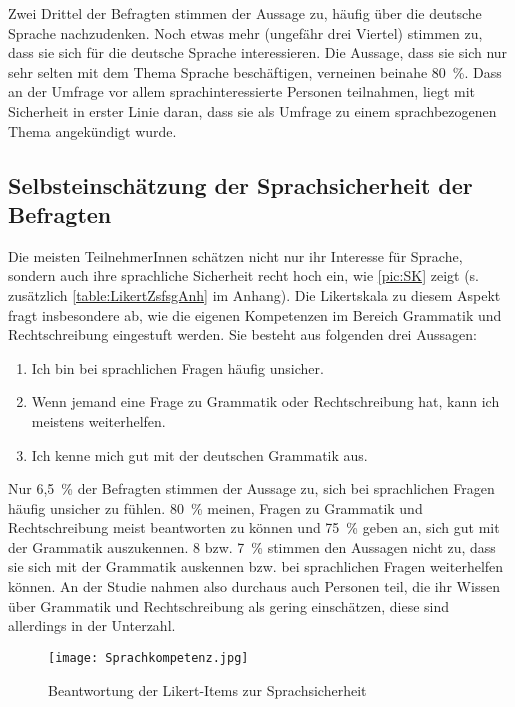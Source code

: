 Zwei Drittel der Befragten stimmen der Aussage zu, häufig über die deutsche Sprache nachzudenken. 
Noch etwas mehr (ungefähr drei Viertel) stimmen zu, dass sie sich für die deutsche Sprache interessieren. 
Die Aussage, dass sie sich nur sehr selten mit dem Thema Sprache beschäftigen, verneinen beinahe 80~\%. 
Dass an der Umfrage vor allem sprachinteressierte Personen teilnahmen, liegt mit Sicherheit in erster Linie daran, dass sie als Umfrage zu einem sprachbezogenen Thema angekündigt wurde. 
\subsection{Selbsteinschätzung der Sprachsicherheit der Befragten}
\label{sec:Sprachsicherheit}
Die meisten TeilnehmerInnen schätzen nicht nur ihr Interesse für Sprache, sondern auch ihre sprachliche Sicherheit recht hoch ein, wie \autoref{pic:SK} zeigt (s. zusätzlich \autoref{table:LikertZsfsgAnh} im Anhang). 
Die Likertskala zu diesem Aspekt fragt insbesondere ab, wie die eigenen Kompetenzen im Bereich Grammatik und Rechtschreibung eingestuft werden. 
Sie besteht aus folgenden drei Aussagen: 
\begin{enumerate}
\item Ich bin bei sprachlichen Fragen häufig unsicher.
\item Wenn jemand eine Frage zu Grammatik oder Rechtschreibung hat, kann ich meistens weiterhelfen.
\item  Ich kenne mich gut mit der deutschen Grammatik aus.
\end{enumerate}

Nur 6,5~\% der Befragten stimmen der Aussage zu, sich bei sprachlichen Fragen häufig unsicher zu fühlen. 
80~\% meinen, Fragen zu Grammatik und Rechtschreibung meist beantworten zu können und 75~\% geben an, sich gut mit der Grammatik auszukennen. 
8 bzw. 7~\% stimmen den Aussagen nicht zu, dass sie sich mit der Grammatik auskennen bzw. bei sprachlichen Fragen weiterhelfen können. 
An der Studie nahmen also durchaus auch Personen teil, die ihr Wissen über Grammatik und Rechtschreibung als gering einschätzen, diese sind allerdings in der Unterzahl.
\begin{figure}[htb]
\centering
\texttt{[image: Sprachkompetenz.jpg]}
\caption{Beantwortung der Likert-Items zur Sprachsicherheit}
\label{pic:SK}
\end{figure}

